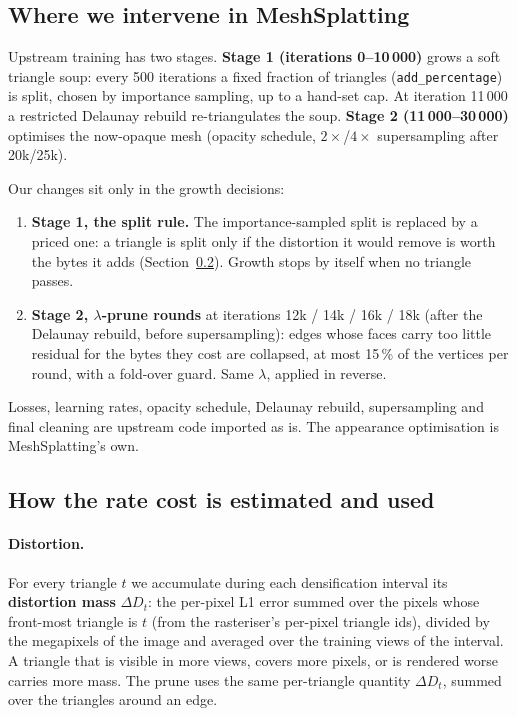 \documentclass[11pt,a4paper]{article}
\begin{document}
\subsection{Where we intervene in MeshSplatting}

Upstream training has two stages. \textbf{Stage 1 (iterations 0--10\,000)} grows a soft triangle soup: every 500 iterations a fixed fraction of triangles (\texttt{add\_percentage}) is split, chosen by importance sampling, up to a hand-set cap. At iteration 11\,000 a restricted Delaunay rebuild re-triangulates the soup. \textbf{Stage 2 (11\,000--30\,000)} optimises the now-opaque mesh (opacity schedule, $2\times$/$4\times$ supersampling after 20k/25k).

Our changes sit only in the growth decisions:
\begin{enumerate}[nosep,leftmargin=*]
  \item \textbf{Stage 1, the split rule.} The importance-sampled split is replaced by a priced one: a triangle is split only if the distortion it would remove is worth the bytes it adds (Section~\ref{sec:rate}). Growth stops by itself when no triangle passes.
  \item \textbf{Stage 2, $\lambda$-prune rounds} at iterations 12k / 14k / 16k / 18k (after the Delaunay rebuild, before supersampling): edges whose faces carry too little residual for the bytes they cost are collapsed, at most 15\,\% of the vertices per round, with a fold-over guard. Same $\lambda$, applied in reverse.
\end{enumerate}
Losses, learning rates, opacity schedule, Delaunay rebuild, supersampling and final cleaning are upstream code imported as is. The appearance optimisation is MeshSplatting's own.

\subsection{How the rate cost is estimated and used}
\label{sec:rate}

\paragraph{Distortion.} For every triangle $t$ we accumulate during each densification interval its \textbf{distortion mass} $\Delta D_t$: the per-pixel L1 error summed over the pixels whose front-most triangle is $t$ (from the rasteriser's per-pixel triangle ids), divided by the megapixels of the image and averaged over the training views of the interval. A triangle that is visible in more views, covers more pixels, or is rendered worse carries more mass. The prune uses the same per-triangle quantity $\Delta D_t$, summed over the triangles around an edge.
\end{document}
